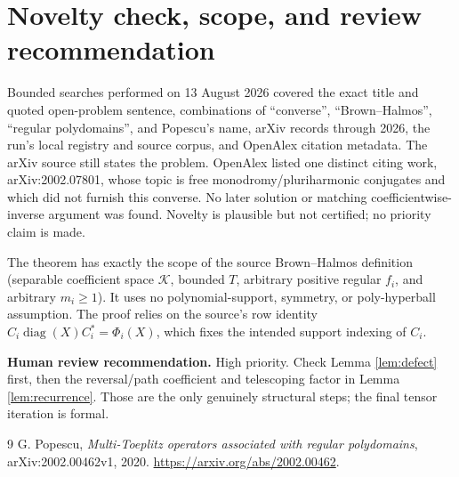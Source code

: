 \documentclass[11pt]{article}
\newcommand{\cK}{\mathcal K}
\begin{document}
\section*{Novelty check, scope, and review recommendation}

Bounded searches performed on 13 August 2026 covered the exact title and quoted open-problem sentence, combinations of ``converse'', ``Brown--Halmos'', ``regular polydomains'', and Popescu's name, arXiv records through 2026, the run's local registry and source corpus, and OpenAlex citation metadata.  The arXiv source still states the problem.  OpenAlex listed one distinct citing work, arXiv:2002.07801, whose topic is free monodromy/pluriharmonic conjugates and which did not furnish this converse.  No later solution or matching coefficientwise-inverse argument was found.  Novelty is plausible but not certified; no priority claim is made.

The theorem has exactly the scope of the source Brown--Halmos definition (separable coefficient space $\cK$, bounded $T$, arbitrary positive regular $f_i$, and arbitrary $m_i\geq1$).  It uses no polynomial-support, symmetry, or poly-hyperball assumption.  The proof relies on the source's row identity $C_i\operatorname{diag}(X)C_i^*=\Phi_i(X)$, which fixes the intended support indexing of $C_i$.

\textbf{Human review recommendation.}  High priority.  Check Lemma \ref{lem:defect} first, then the reversal/path coefficient and telescoping factor in Lemma \ref{lem:recurrence}.  Those are the only genuinely structural steps; the final tensor iteration is formal.

\begin{thebibliography}{9}
G. Popescu,
\emph{Multi-Toeplitz operators associated with regular polydomains},
arXiv:2002.00462v1, 2020.
\url{https://arxiv.org/abs/2002.00462}.
\end{thebibliography}
\end{document}
